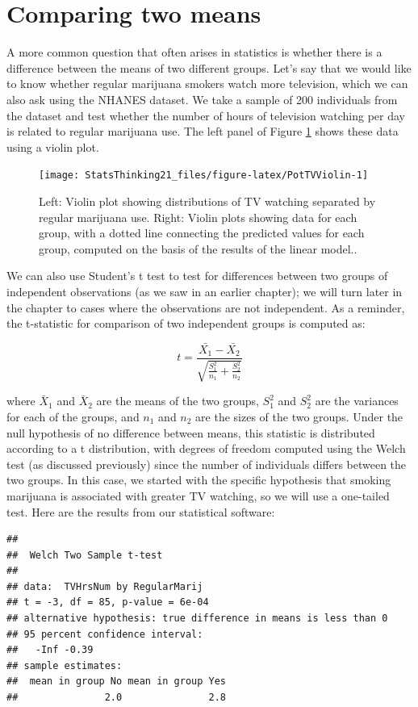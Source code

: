 \documentclass[12pt,]{book}
\theoremstyle{definition}
\theoremstyle{definition}
\theoremstyle{definition}
\theoremstyle{remark}
\begin{document}
\hypertarget{comparing-two-means}{%
\section{Comparing two means}\label{comparing-two-means}}

A more common question that often arises in statistics is whether there is a difference between the means of two different groups. Let's say that we would like to know whether regular marijuana smokers watch more television, which we can also ask using the NHANES dataset. We take a sample of 200 individuals from the dataset and test whether the number of hours of television watching per day is related to regular marijuana use. The left panel of Figure \ref{fig:PotTVViolin} shows these data using a violin plot.

\begin{figure}
\texttt{[image: StatsThinking21\_files/figure-latex/PotTVViolin-1]} \caption{Left: Violin plot showing distributions of TV watching separated by regular marijuana use. Right: Violin plots showing data for each group, with a dotted line connecting the predicted values for each group, computed on the basis of the results of the linear model.. }\label{fig:PotTVViolin}
\end{figure}

We can also use Student's t test to test for differences between two groups of independent observations (as we saw in an earlier chapter); we will turn later in the chapter to cases where the observations are not independent. As a reminder, the t-statistic for comparison of two independent groups is computed as:

\[
t = \frac{\bar{X_1} - \bar{X_2}}{\sqrt{\frac{S_1^2}{n_1} + \frac{S_2^2}{n_2}}}
\]

where \(\bar{X}_1\) and \(\bar{X}_2\) are the means of the two groups, \(S^2_1\) and \(S^2_2\) are the variances for each of the groups, and \(n_1\) and \(n_2\) are the sizes of the two groups. Under the null hypothesis of no difference between means, this statistic is distributed according to a t distribution, with degrees of freedom computed using the Welch test (as discussed previously) since the number of individuals differs between the two groups. In this case, we started with the specific hypothesis that smoking marijuana is associated with greater TV watching, so we will use a one-tailed test. Here are the results from our statistical software:

\begin{verbatim}
## 
##  Welch Two Sample t-test
## 
## data:  TVHrsNum by RegularMarij
## t = -3, df = 85, p-value = 6e-04
## alternative hypothesis: true difference in means is less than 0
## 95 percent confidence interval:
##   -Inf -0.39
## sample estimates:
##  mean in group No mean in group Yes 
##               2.0               2.8
\end{verbatim}
\end{document}

